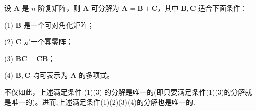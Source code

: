 \documentclass[../../main.tex]{subfiles}
\begin{document}
\begin{theorem}\label{theorem:Jordan-Chevalley分解}
设 $\boldsymbol{A}$ 是 $n$ 阶复矩阵，则 $\boldsymbol{A}$ 可分解为 $\boldsymbol{A} = \boldsymbol{B} + \boldsymbol{C}$，其中 $\boldsymbol{B}, \boldsymbol{C}$ 适合下面条件：

(1) $\boldsymbol{B}$ 是一个可对角化矩阵；

(2) $\boldsymbol{C}$ 是一个幂零阵；

(3) $\boldsymbol{BC} = \boldsymbol{CB}$；

(4) $\boldsymbol{B}, \boldsymbol{C}$ 均可表示为 $\boldsymbol{A}$ 的多项式。

不仅如此，上述满足条件 (1)(3) 的分解是唯一的(即只要满足条件(1)(3)的分解就是唯一的)。进而,上述满足条件(1)(2)(3)(4)的分解也是唯一的.
\end{theorem}
\end{document}
